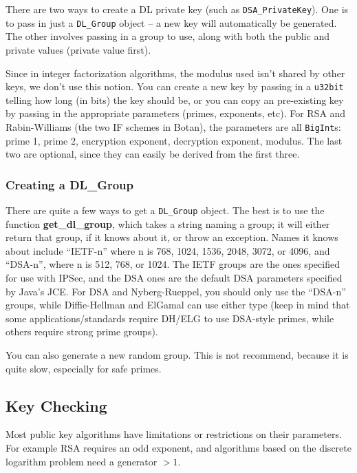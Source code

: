\documentclass{article}
\newcommand{\function}[1]{\textbf{#1}}
\newcommand{\type}[1]{\texttt{#1}}
\begin{document}
There are two ways to create a DL private key (such as
\type{DSA\_PrivateKey}). One is to pass in just a \type{DL\_Group} object -- a
new key will automatically be generated. The other involves passing in a group
to use, along with both the public and private values (private value first).

Since in integer factorization algorithms, the modulus used isn't shared by
other keys, we don't use this notion. You can create a new key by passing in a
\type{u32bit} telling how long (in bits) the key should be, or you can copy an
pre-existing key by passing in the appropriate parameters (primes, exponents,
etc). For RSA and Rabin-Williams (the two IF schemes in Botan), the parameters
are all \type{BigInt}s: prime 1, prime 2, encryption exponent, decryption
exponent, modulus. The last two are optional, since they can easily be derived
from the first three.

\subsubsection{Creating a DL\_Group}

There are quite a few ways to get a \type{DL\_Group} object. The best is to use
the function \function{get\_dl\_group}, which takes a string naming a group; it
will either return that group, if it knows about it, or throw an
exception. Names it knows about include ``IETF-n'' where n is 768, 1024, 1536,
2048, 3072, or 4096, and ``DSA-n'', where n is 512, 768, or 1024. The IETF
groups are the ones specified for use with IPSec, and the DSA ones are the
default DSA parameters specified by Java's JCE. For DSA and Nyberg-Rueppel, you
should only use the ``DSA-n'' groups, while Diffie-Hellman and ElGamal can use
either type (keep in mind that some applications/standards require DH/ELG to
use DSA-style primes, while others require strong prime groups).

You can also generate a new random group. This is not recommend, because it is
quite slow, especially for safe primes.

\subsection{Key Checking}

Most public key algorithms have limitations or restrictions on their
parameters. For example RSA requires an odd exponent, and algorithms based on
the discrete logarithm problem need a generator $> 1$.
\end{document}
